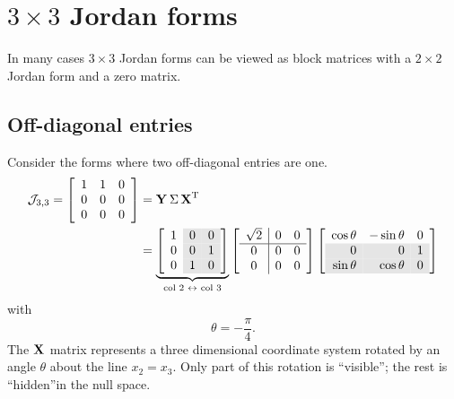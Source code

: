 \section[]{$3\times3$ Jordan forms}
\label{sec:Jordan:3}

In many cases $3\times3$ Jordan forms can be viewed as  block matrices with a $2\times2$ Jordan form and a zero matrix.

\subsection{Off-diagonal entries}
Consider the forms where two off-diagonal entries are one.
\begin{equation}
  \begin{split}
    \mathcal{J}_{3,3} = 
\mat{ccc}
{
                1 & 1 & 0 \\
                0 & 0 & 0 \\
                0 & 0 & 0
}   &= \svd{T}\\
   &=
\underbrace{\mat{c>{\columncolor{ltgray}}c>{\columncolor{ltgray}}c}
{
                1 & 0 & 0 \\
                0 & 0 & 1 \\
                0 & 1 & 0
}}_{\text{col 2 $\leftrightarrow$ col 3}}
\mat{c|cc}{                
            \sqrt{2} & 0 & 0 \\\hline
            0 & 0 & 0 \\
            0 & 0 & 0
}%
\mat{rrr}
{                
\cos\theta & -\sin\theta & 0 \\
\rowcolor{ltgray}
0 & 0 & 1 \\
\rowcolor{ltgray}
\sin\theta & \cos\theta & 0
}
  \end{split}
\end{equation}
with
\begin{equation}
  \theta = -\frac{\pi}{4}.
\end{equation}
The $\textbf{X}^{\mathrm{}}$ matrix represents a three dimensional coordinate system rotated by an angle $\theta$ about the line $x_{2}=x_{3}$. Only part of this rotation is ``visible''; the rest is ``hidden''in the null space.

